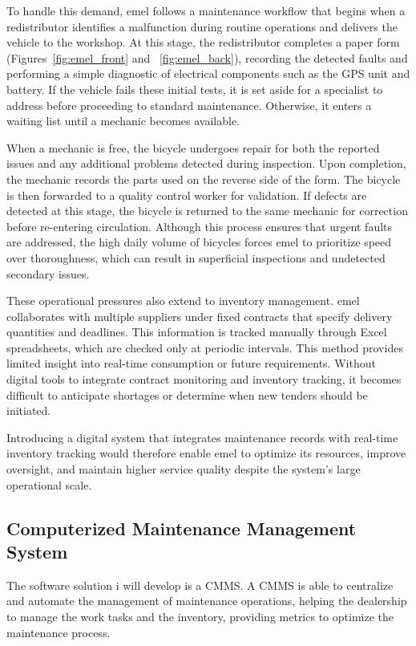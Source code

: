 To handle this demand, \ac{emel} follows a maintenance workflow that begins when a redistributor identifies a malfunction during routine operations and delivers the vehicle to the workshop. At this stage, the redistributor completes a paper form (Figures~\ref{fig:emel_front} and ~\ref{fig:emel_back}), recording the detected faults and performing a simple diagnostic of electrical components such as the GPS unit and battery. If the vehicle fails these initial tests, it is set aside for a specialist to address before proceeding to standard maintenance. Otherwise, it enters a waiting list until a mechanic becomes available.

When a mechanic is free, the bicycle undergoes repair for both the reported issues and any additional problems detected during inspection. Upon completion, the mechanic records the parts used on the reverse side of the form. The bicycle is then forwarded to a quality control worker for validation. If defects are detected at this stage, the bicycle is returned to the same mechanic for correction before re-entering circulation. Although this process ensures that urgent faults are addressed, the high daily volume of bicycles forces \ac{emel} to prioritize speed over thoroughness, which can result in superficial inspections and undetected secondary issues.

These operational pressures also extend to inventory management. \ac{emel} collaborates with multiple suppliers under fixed contracts that specify delivery quantities and deadlines. This information is tracked manually through Excel spreadsheets, which are checked only at periodic intervals. This method provides limited insight into real-time consumption or future requirements. Without digital tools to integrate contract monitoring and inventory tracking, it becomes difficult to anticipate shortages or determine when new tenders should be initiated.

Introducing a digital system that integrates maintenance records with real-time inventory tracking would therefore enable \ac{emel} to optimize its resources, improve oversight, and maintain higher service quality despite the system's large operational scale.


\subsection{Computerized Maintenance Management System}

The software solution i will develop is a \ac{CMMS}.
A \ac{CMMS} is able to centralize and automate the management of maintenance operations, helping the dealership to manage the work tasks and the inventory, providing metrics to optimize the maintenance process.

